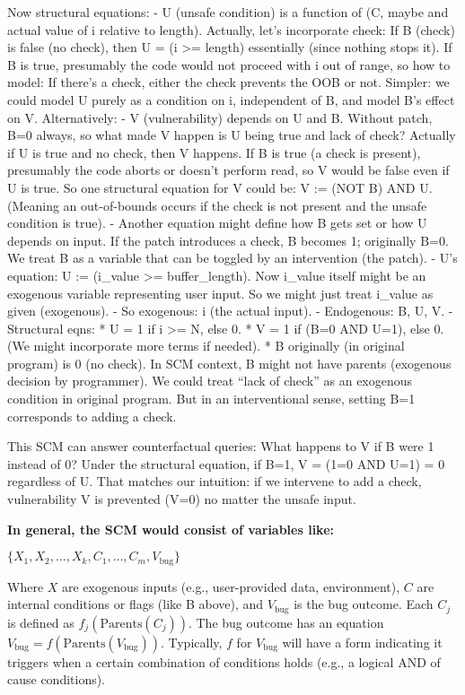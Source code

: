 \documentclass[conference,compsoc]{IEEEtran}
\begin{document}
Now structural equations: - U (unsafe condition) is a function of (C,
maybe and actual value of i relative to length). Actually, let's
incorporate check: If B (check) is false (no check), then U = (i
\textgreater= length) essentially (since nothing stops it). If B is
true, presumably the code would not proceed with i out of range, so how
to model: If there's a check, either the check prevents the OOB or not.
Simpler: we could model U purely as a condition on i, independent of B,
and model B's effect on V. Alternatively: - V (vulnerability) depends on
U and B. Without patch, B=0 always, so what made V happen is U being
true and lack of check? Actually if U is true and no check, then V
happens. If B is true (a check is present), presumably the code aborts
or doesn't perform read, so V would be false even if U is true. So one
structural equation for V could be: V := (NOT B) AND U. (Meaning an
out-of-bounds occurs if the check is not present and the unsafe
condition is true). - Another equation might define how B gets set or
how U depends on input. If the patch introduces a check, B becomes 1;
originally B=0. We treat B as a variable that can be toggled by an
intervention (the patch). - U's equation: U := (i\_value \textgreater=
buffer\_length). Now i\_value itself might be an exogenous variable
representing user input. So we might just treat i\_value as given
(exogenous). - So exogenous: i (the actual input). - Endogenous: B, U,
V. - Structural eqns: * U = 1 if i \textgreater= N, else 0. * V = 1 if
(B=0 AND U=1), else 0. (We might incorporate more terms if needed). * B
originally (in original program) is 0 (no check). In SCM context, B
might not have parents (exogenous decision by programmer). We could
treat ``lack of check'' as an exogenous condition in original program.
But in an interventional sense, setting B=1 corresponds to adding a
check.

This SCM can answer counterfactual queries: What happens to V if B were
1 instead of 0? Under the structural equation, if B=1, V = (1=0 AND U=1)
= 0 regardless of U. That matches our intuition: if we intervene to add
a check, vulnerability V is prevented (V=0) no matter the unsafe input.

\textbf{In general, the SCM would consist of variables like:}

\(\{X_1, X_2, \ldots, X_k, C_1, \ldots, C_m, V_{\text{bug}}\}\)

Where \(X\) are exogenous inputs (e.g., user-provided data, environment), \(C\)
are internal conditions or flags (like B above), and \(V_{\text{bug}}\) is the
bug outcome. Each \(C_j\) is defined as \(f_j(\text{Parents}(C_j))\). The bug
outcome has an equation \(V_{\text{bug}} = f(\text{Parents}(V_{\text{bug}}))\).
Typically, \(f\) for \(V_{\text{bug}}\) will have a form indicating it triggers
when a certain combination of conditions holds (e.g., a logical AND of cause
conditions).
\end{document}
